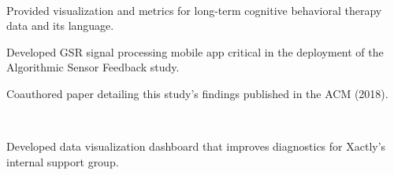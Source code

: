 \documentclass[]{hieudo-build}
\begin{document}
\begin{minipage}[t]{0.63\textwidth}
 \\
\begin{tightemize}
\item Provided visualization and metrics for long-term cognitive behavioral therapy data and its language. \\
\smallskip
{}
\end{tightemize}

\begin{tightemize}
\item Developed GSR signal processing mobile app critical in the deployment of the Algorithmic Sensor Feedback study. \\
\smallskip
{}
\item Coauthored paper detailing this study's findings published in the ACM (2018).
\end{tightemize}
\sectionsep

 \\
\begin{tightemize}
\item Developed data visualization dashboard that improves diagnostics for Xactly's internal support group. \\
\smallskip
{}
\end{tightemize}
\sectionsep


%
%
\end{minipage} 
\hfill
\end{document}
